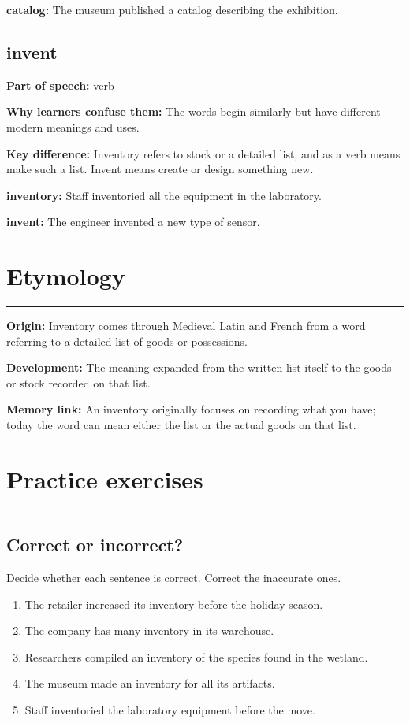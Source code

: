 \documentclass[11pt]{article}
\newcommand{\sectionrule}{\par\vspace{-0.5em}\noindent\textcolor{Accent}{\rule{\linewidth}{0.6pt}}\par}
\begin{document}
\textbf{catalog:} The museum published a catalog describing the exhibition.

\subsection{invent}
\textbf{Part of speech:} verb

\textbf{Why learners confuse them:} The words begin similarly but have different modern meanings and uses.

\textbf{Key difference:} Inventory refers to stock or a detailed list, and as a verb means make such a list. Invent means create or design something new.

\textbf{inventory:} Staff inventoried all the equipment in the laboratory.

\textbf{invent:} The engineer invented a new type of sensor.

\section{Etymology}
\sectionrule
\textbf{Origin:} Inventory comes through Medieval Latin and French from a word referring to a detailed list of goods or possessions.

\textbf{Development:} The meaning expanded from the written list itself to the goods or stock recorded on that list.

\textbf{Memory link:} An inventory originally focuses on recording what you have; today the word can mean either the list or the actual goods on that list.

\section{Practice exercises}
\sectionrule
\subsection{Correct or incorrect?}
Decide whether each sentence is correct. Correct the inaccurate ones.

\begin{enumerate}
  \item The retailer increased its inventory before the holiday season.
  \item The company has many inventory in its warehouse.
  \item Researchers compiled an inventory of the species found in the wetland.
  \item The museum made an inventory for all its artifacts.
  \item Staff inventoried the laboratory equipment before the move.
\end{enumerate}
\end{document}
